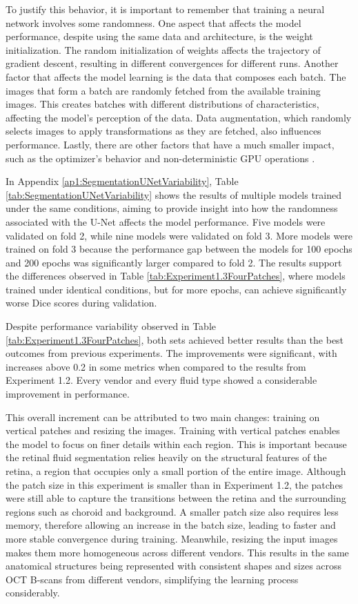To justify this behavior, it is important to remember that training a neural network involves some randomness. One aspect that affects the model performance, despite using the same data and architecture, is the weight initialization. The random initialization of weights affects the trajectory of gradient descent, resulting in different convergences for different runs. Another factor that affects the model learning is the data that composes each batch. The images that form a batch are randomly fetched from the available training images. This creates batches with different distributions of characteristics, affecting the model's perception of the data. Data augmentation, which randomly selects images to apply transformations as they are fetched, also influences performance. Lastly, there are other factors that have a much smaller impact, such as the optimizer's behavior and non-deterministic GPU operations \parencite{Akesson2024, Altarabichi2024}. 
\par
In Appendix \ref{ap1:SegmentationUNetVariability}, Table \ref{tab:SegmentationUNetVariability} shows the results of multiple models trained under the same conditions, aiming to provide insight into how the randomness associated with the U-Net affects the model performance. Five models were validated on fold 2, while nine models were validated on fold 3. More models were trained on fold 3 because the performance gap between the models for 100 epochs and 200 epochs was significantly larger compared to fold 2. The results support the differences observed in Table \ref{tab:Experiment1.3FourPatches}, where models trained under identical conditions, but for more epochs, can achieve significantly worse Dice scores during validation.
\par
Despite performance variability observed in Table \ref{tab:Experiment1.3FourPatches}, both sets achieved better results than the best outcomes from previous experiments. The improvements were significant, with increases above 0.2 in some metrics when compared to the results from Experiment 1.2. Every vendor and every fluid type showed a considerable improvement in performance.
\par
This overall increment can be attributed to two main changes: training on vertical patches and resizing the images. Training with vertical patches enables the model to focus on finer details within each region. This is important because the retinal fluid segmentation relies heavily on the structural features of the retina, a region that occupies only a small portion of the entire image. Although the patch size in this experiment is smaller than in Experiment 1.2, the patches were still able to capture the transitions between the retina and the surrounding regions such as choroid and background. A smaller patch size also requires less memory, therefore allowing an increase in the batch size, leading to faster and more stable convergence during training. Meanwhile, resizing the input images makes them more homogeneous across different vendors. This results in the same anatomical structures being represented with consistent shapes and sizes across OCT B-scans from different vendors, simplifying the learning process considerably.
